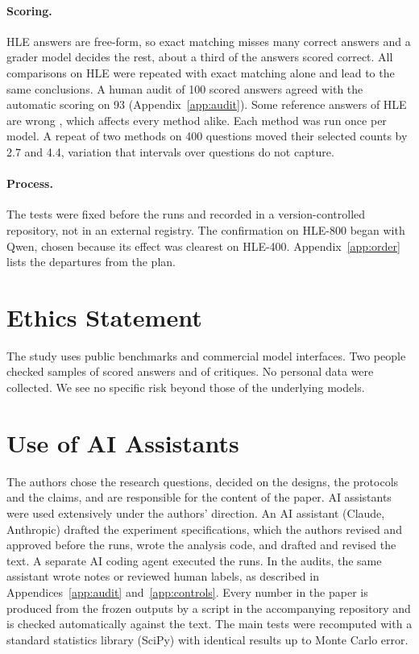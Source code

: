 \documentclass[11pt]{article}
\newcommand{\qw}{Qwen}
\begin{document}
\paragraph{Scoring.}
HLE answers are free-form, so exact matching misses many correct answers and a grader model decides the rest, about a third of the answers scored correct.
All comparisons on HLE were repeated with exact matching alone and lead to the same conclusions. A human audit of 100 scored answers agreed with the automatic scoring on 93 (Appendix~\ref{app:audit}).
Some reference answers of HLE are wrong \citep{zhai2026hleverified}, which affects every method alike.
Each method was run once per model. A repeat of two methods on 400 questions moved their selected counts by 2.7 and 4.4, variation that intervals over questions do not capture.

\paragraph{Process.}
The tests were fixed before the runs and recorded in a version-controlled repository, not in an external registry.
The confirmation on HLE-800 began with \qw, chosen because its effect was clearest on HLE-400.
Appendix~\ref{app:order} lists the departures from the plan.

\section*{Ethics Statement}

The study uses public benchmarks and commercial model interfaces.
Two people checked samples of scored answers and of critiques. No personal data were collected.
We see no specific risk beyond those of the underlying models.

\section*{Use of AI Assistants}

The authors chose the research questions, decided on the designs, the protocols and the claims, and are responsible for the content of the paper.
AI assistants were used extensively under the authors' direction.
An AI assistant (Claude, Anthropic) drafted the experiment specifications, which the authors revised and approved before the runs, wrote the analysis code, and drafted and revised the text. A separate AI coding agent executed the runs.
In the audits, the same assistant wrote notes or reviewed human labels, as described in Appendices~\ref{app:audit} and~\ref{app:controls}.
Every number in the paper is produced from the frozen outputs by a script in the accompanying repository and is checked automatically against the text. The main tests were recomputed with a standard statistics library (SciPy) with identical results up to Monte Carlo error.
\end{document}
